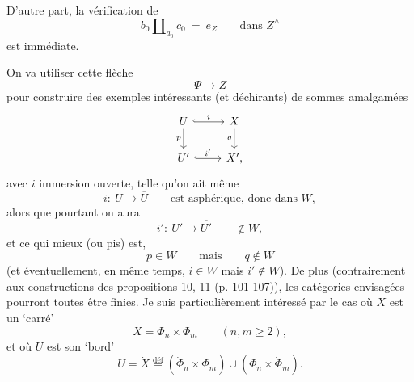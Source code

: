 D'autre part, la vérification de
\[ b_0 \amalg_{a_0} c_0 \ = \ e_Z \qquad \text{dans } Z^{\wedge} \]
est immédiate.

On va utiliser cette flèche
\[ \Psi \longrightarrow Z \]
pour construire des exemples intéressants (et déchirants) de sommes amalgamées
\[
\begin{tikzcd}
U \arrow[r, hook, "i"] \arrow[d, "p"'] & X \arrow[d, "q"'] \\
U' \arrow[r, hook, "i'"] & X',
\end{tikzcd}
\]
avec $i$ immersion ouverte, telle qu'on ait même
\[ i :\ U \longrightarrow \overline{U} \qquad \text{est asphérique, donc dans } W, \]
alors que pourtant on aura
\[ i' :\ U' \longrightarrow \overline{U'} \qquad \notin W, \]
et ce qui mieux (ou pis) est,
\[ p \in W \qquad \text{mais} \qquad q \notin W \]
(et éventuellement, en même temps, $i \in W$ mais $i' \notin W$). De plus (contrairement aux constructions des propositions 10, 11 (p. 101-107)), les catégories envisagées pourront toutes être finies. Je suis particulièrement intéressé par le cas où $X$ est un ‘carré’
\[ X = \Phi_n \times \Phi_m \qquad (n,m \geq 2), \]
et où $U$ est son ‘bord’
\[ U = \dot{X} \overset{\text{déf}}{=} (\dot{\Phi}_n \times \Phi_m) \cup (\Phi_n \times \dot{\Phi}_m). \]

